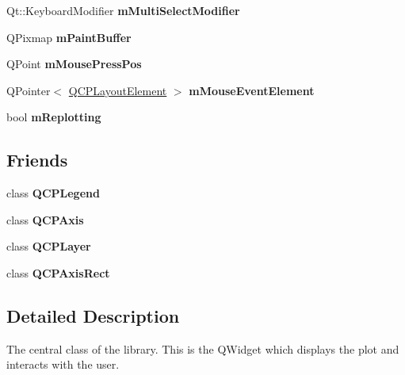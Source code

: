 \begin{DoxyCompactItemize}
Qt\+::\+Keyboard\+Modifier {\bfseries m\+Multi\+Select\+Modifier}
\item 
\mbox{\label{class_q_custom_plot_a753630df96e0672098d9e88bd41d1913}} 
Q\+Pixmap {\bfseries m\+Paint\+Buffer}
\item 
\mbox{\label{class_q_custom_plot_ac57090da95056ae4dd67be67adfa85bd}} 
Q\+Point {\bfseries m\+Mouse\+Press\+Pos}
\item 
\mbox{\label{class_q_custom_plot_a2f2e8b25e59cf3cf7b15e4767c02e747}} 
Q\+Pointer$<$ \mbox{\hyperlink{class_q_c_p_layout_element}{Q\+C\+P\+Layout\+Element}} $>$ {\bfseries m\+Mouse\+Event\+Element}
\item 
\mbox{\label{class_q_custom_plot_ab30daeca6612c3948afd368dce5f1c39}} 
bool {\bfseries m\+Replotting}
\end{DoxyCompactItemize}
\subsection*{Friends}
\begin{DoxyCompactItemize}
\item 
\mbox{\label{class_q_custom_plot_a8429035e7adfbd7f05805a6530ad5e3b}} 
class {\bfseries Q\+C\+P\+Legend}
\item 
\mbox{\label{class_q_custom_plot_af123edeca169ec7a31958a1d714e1a8a}} 
class {\bfseries Q\+C\+P\+Axis}
\item 
\mbox{\label{class_q_custom_plot_a5dbf96bf7664c1b6fce49063eeea6eef}} 
class {\bfseries Q\+C\+P\+Layer}
\item 
\mbox{\label{class_q_custom_plot_acbf20ecb140f66c5fd1bc64ae0762990}} 
class {\bfseries Q\+C\+P\+Axis\+Rect}
\end{DoxyCompactItemize}


\subsection{Detailed Description}
The central class of the library. This is the Q\+Widget which displays the plot and interacts with the user. 

